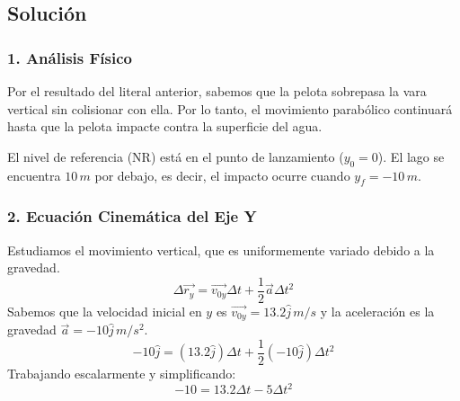 \documentclass[12pt, a4paper]{article}
\begin{document}
\begin{center}
\end{center}

\subsection*{Solución}

\subsubsection*{1. Análisis Físico}
Por el resultado del literal anterior, sabemos que la pelota sobrepasa la vara vertical sin colisionar con ella. Por lo tanto, el movimiento parabólico continuará hasta que la pelota impacte contra la superficie del agua. 

El nivel de referencia (NR) está en el punto de lanzamiento ($y_0 = 0$). El lago se encuentra $10 \, \si{m}$ por debajo, es decir, el impacto ocurre cuando $y_f = -10 \, \si{m}$.

\subsubsection*{2. Ecuación Cinemática del Eje Y}
Estudiamos el movimiento vertical, que es uniformemente variado debido a la gravedad.
$$ \Delta \vec{r_y} = \vec{v_{0y}} \Delta t + \frac{1}{2} \vec{a} \Delta t^2 $$
Sabemos que la velocidad inicial en $y$ es $\vec{v_{0y}} = 13.2\hat{j} \, \si{m/s}$ y la aceleración es la gravedad $\vec{a} = -10\hat{j} \, \si{m/s^2}$.
$$ -10\hat{j} = (13.2\hat{j}) \Delta t + \frac{1}{2} (-10\hat{j}) \Delta t^2 $$
Trabajando escalarmente y simplificando:
$$ -10 = 13.2 \Delta t - 5 \Delta t^2 $$
\end{document}
